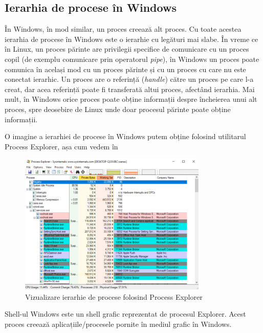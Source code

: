 \subsection{Ierarhia de procese în Windows}
\label{sec:procese-ierarhie-windows}

În Windows, în mod similar, un proces creează alt proces. Cu toate acestea
ierarhia de procese în Windows este o ierarhie cu legături mai slabe. În vreme
ce în Linux, un proces părinte are privilegii specifice de comunicare cu un
proces copil (de exemplu comunicare prin operatorul \textit{pipe}), în Windows un proces poate comunica în
același mod cu un proces părinte și cu un proces cu care nu este conectat
ierarhic. Un proces are o referință (\textit{handle}) către un proces pe care l-a creat, dar acea referință poate fi transferată altui proces, afectând ierarhia. Mai mult, în Windows orice proces poate obține informații despre
încheierea unui alt proces, spre deosebire de Linux unde doar procesul părinte
poate obține informații.

O imagine a ierarhiei de procese în Windows putem obține folosind utilitarul
Process Explorer, așa cum vedem în 

\begin{figure}[!htbp]
	\centering
        \includegraphics[width=0.8\textwidth]{chapters/04-process/img/process-explorer.png}
        \caption{Vizualizare ierarhie de procese folosind Process Explorer}
        \label{fig:process-process-explorer-hierarchy}
\end{figure}

Shell-ul Windows este un shell grafic reprezentat de procesul Explorer. Acest
proces creează aplicațiile/procesele pornite în mediul grafic în Windows.

